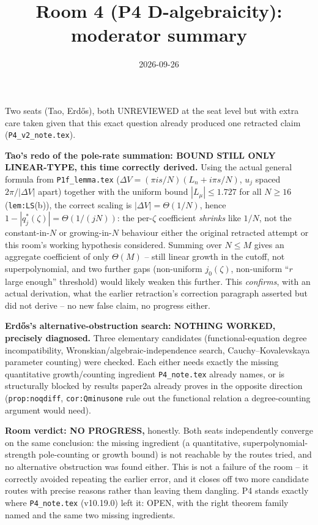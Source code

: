 \documentclass[11pt]{article}
\title{Room 4 (P4 D-algebraicity): moderator summary}
\date{2026-09-26}
\begin{document}
\maketitle

Two seats (Tao, Erd\H os), both UNREVIEWED at the seat level but with extra care taken given that
this exact question already produced one retracted claim (\texttt{P4\_v2\_note.tex}).

\textbf{Tao's redo of the pole-rate summation: BOUND STILL ONLY LINEAR-TYPE, this time correctly
derived.} Using the actual general formula from \texttt{P1f\_lemma.tex} ($\Delta V=
(\pi is/N)(L_n+i\pi s/N)$, $u_j$ spaced $2\pi/|\Delta V|$ apart) together with the uniform bound
$|L_\mu|\le1.727$ for all $N\ge16$ (\texttt{lem:LS}(b)), the correct scaling is $|\Delta V|=
\Theta(1/N)$, hence $1-|q^\ast_j(\zeta)|=\Theta(1/(jN))$: the per-$\zeta$ coefficient \emph{shrinks}
like $1/N$, not the constant-in-$N$ or growing-in-$N$ behaviour either the original retracted
attempt or this room's working hypothesis considered. Summing over $N\le M$ gives an aggregate
coefficient of only $\Theta(M)$ -- still linear growth in the cutoff, not superpolynomial, and two
further gaps (non-uniform $j_0(\zeta)$, non-uniform ``$r$ large enough'' threshold) would likely
weaken this further. This \emph{confirms}, with an actual derivation, what the earlier retraction's
correction paragraph asserted but did not derive -- no new false claim, no progress either.

\textbf{Erd\H os's alternative-obstruction search: NOTHING WORKED, precisely diagnosed.} Three
elementary candidates (functional-equation degree incompatibility, Wronskian/algebraic-independence
search, Cauchy--Kovalevskaya parameter counting) were checked. Each either needs exactly the missing
quantitative growth/counting ingredient \texttt{P4\_note.tex} already names, or is structurally
blocked by results paper2a already proves in the opposite direction (\texttt{prop:noqdiff},
\texttt{cor:Qminusone} rule out the functional relation a degree-counting argument would need).

\textbf{Room verdict: NO PROGRESS,} honestly. Both seats independently converge on the same
conclusion: the missing ingredient (a quantitative, superpolynomial-strength pole-counting or growth
bound) is not reachable by the routes tried, and no alternative obstruction was found either. This
is not a failure of the room -- it correctly avoided repeating the earlier error, and it closes off
two more candidate routes with precise reasons rather than leaving them dangling. P4 stands exactly
where \texttt{P4\_note.tex} (v10.19.0) left it: OPEN, with the right theorem family named and the
same two missing ingredients.
\end{document}
